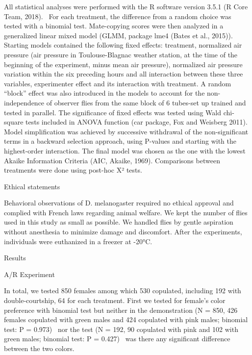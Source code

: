 \documentclass{article}
\begin{document}
All statistical analyses were performed with the R software version 3.5.1 (R Core Team, 2018). \ For each treatment, the difference from a random choice was tested with a binomial test. Mate-copying scores were then analyzed in a generalized linear mixed model (GLMM, package lme4 (Bates et al., 2015)). Starting models contained the following fixed effects: treatment, normalized air pressure (air pressure in Toulouse-Blagnac weather station, at the time of the beginning of the experiment, minus mean air pressure), normalized air pressure variation within the six preceding hours and all interaction between these three variables, experimenter effect and its interaction with treatment. A random “block” effect was also introduced in the models to account for the non-independence of observer flies from the same block of 6 tubes-set up trained and tested in parallel. The significance of fixed effects was tested using Wald chi-square tests included in ANOVA function (car package, Fox and Weisberg 2011). Model simplification was achieved by successive withdrawal of the non-significant terms in a backward selection approach, using P-values and starting with the highest-order interaction. The final model was chosen as the one with the lowest Akaike Information Criteria (AIC, Akaike, 1969). Comparisons between treatments were done using post-hoc X² tests. 


\bigskip


\bigskip


\bigskip


\bigskip


\bigskip

Ethical statements


\bigskip

Behavioral observations of D. melanogaster required no ethical approval and complied with French laws regarding animal welfare. We kept the number of flies used in this study as small as possible. We handled flies by gentle aspiration without anesthesia to minimize damage and discomfort. After the experiments, individuals were euthanized in a freezer at -20°C.


\bigskip


\bigskip


\bigskip


\bigskip

Results


\bigskip

A/R Experiment


\bigskip

In total, we tested 850 females among which 530 copulated, including 192 with double-courtship, 64 for each treatment. First we tested for female's color preference with binomial test but neither in the demonstration (N = 850, 426 females copulated with green males and 424 copulated with pink males; binomial test: P = 0.973) \ nor the test (N = 192, 90 copulated with pink and 102 with green males; binomial test: P = 0.427) \ was there any significant difference between the two colors.
\end{document}
